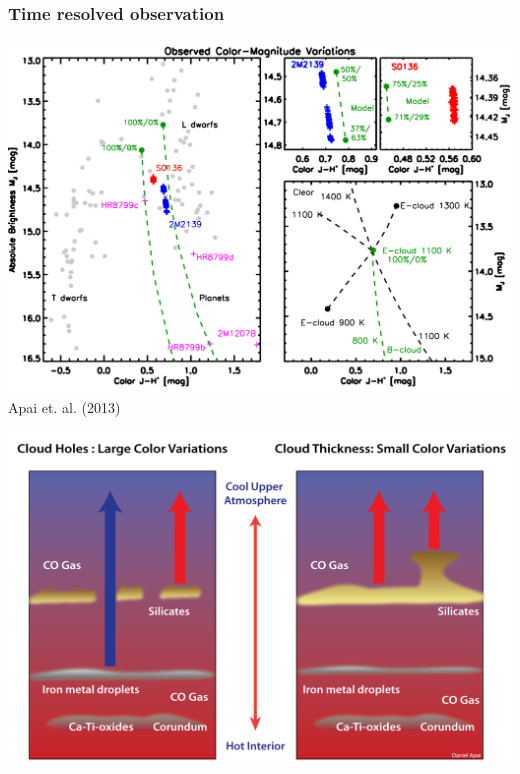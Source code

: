 \documentclass[14pt]{beamer}
\newcommand*\figcite[1]{\vspace*{\fill}\raggedleft\footnotesize{#1}}
\begin{document}
\begin{frame}
  \frametitle{Time resolved observation}
  \includegraphics[width=\textwidth]{CMD}\\
  \figcite{Apai et. al. (2013)}
\end{frame}

\begin{frame}
  \includegraphics[height=0.8\textheight]{varyThick}
\end{frame}
\end{document}
